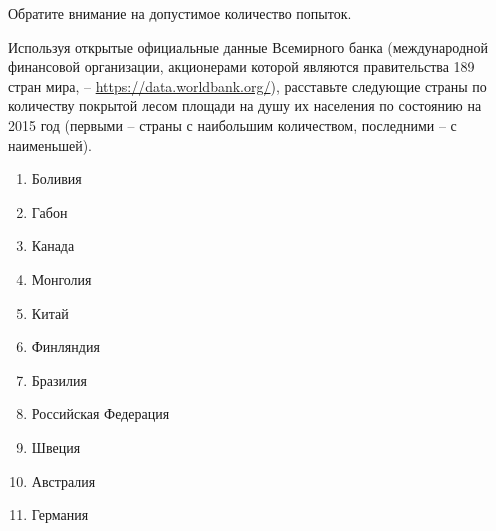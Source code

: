 
Обратите внимание на допустимое количество попыток.

Используя
открытые официальные данные Всемирного банка (международной финансовой
организации, акционерами которой являются правительства 189 стран мира, – \url{https://data.worldbank.org/}), расставьте
следующие страны по количеству покрытой лесом площади на душу их населения по
состоянию на 2015 год (первыми – страны с наибольшим количеством, последними – с
наименьшей).

\begin{enumerate}
    \item Боливия
    \item Габон
    \item Канада
    \item Монголия
    \item Китай
    \item Финляндия
    \item Бразилия
    \item Российская Федерация
    \item Швеция
    \item Австралия
    \item Германия
\end{enumerate}

\soultionSection


